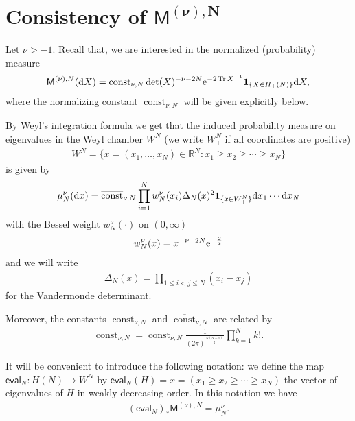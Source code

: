 \section[Consistency of $\mathsf{M}^{(\nu),N}$]{Consistency of $\boldsymbol{\mathsf{M}^{(\nu),N}}$}\label{section2}

Let $\nu>-1$. Recall that, we are interested in the normalized (probability) measure
\begin{gather*}
\mathsf{M}^{(\nu),N}({\rm d}X)= \operatorname{const}_{\nu, N} \det(X)^{-\nu-2N} {\rm e}^{-2\operatorname{Tr}X^{-1}}\mathbf{1}_{\{X \in H_+(N)\}}{\rm d}X,
\end{gather*}
where the normalizing constant $\operatorname{const}_{\nu, N}$ will be given explicitly below.

By Weyl's integration formula we get that the induced probability measure on eigenvalues in the Weyl chamber $W^N$ (we write $W^N_+$ if all coordinates are positive)
\begin{gather*}
W^N=\big\{x=(x_1,\dots,x_N) \in \mathbb{R}^N\colon x_1 \ge x_2 \ge \cdots \ge x_N \big\}
\end{gather*}
is given by
\begin{gather*}
\mu_N^{\nu}({\rm d}x)=\overline{\operatorname{const}}_{\nu, N}\prod_{i=1}^{N}w_N^{\nu}(x_i)\Delta_N(x)^2\mathbf{1}_{ \{x \in W_+^N \}}{\rm d}x_1\cdots {\rm d}x_N
\end{gather*}
with the Bessel weight $w_N^{\nu}(\cdot)$ on $(0,\infty)$
\begin{gather*}
w_N^{\nu}(x)=x^{-\nu-2N}{\rm e}^{-\frac{2}{x}}
\end{gather*}
and we will write
\begin{gather*}
\Delta_N(x)=\prod_{1 \le i<j \le N}^{}(x_i-x_j)
\end{gather*}
for the Vandermonde determinant.

Moreover, the constants $\operatorname{const}_{\nu, N}$ and $\overline{\operatorname{const}}_{\nu, N}$ are related by
\begin{gather*}
\operatorname{const}_{\nu, N}=\overline{\operatorname{const}}_{\nu, N}\frac{1}{(2\pi)^\frac{N(N-1)}{2}}\prod_{k=1}^{N}k!.
\end{gather*}

It will be convenient to introduce the following notation: we define the map $\mathsf{eval}_N\colon H(N) \to W^N$ by $\mathsf{eval}_N(H)=x=(x_1\ge x_2 \ge \cdots \ge x_N )$ the vector of eigenvalues of $H$ in weakly decreasing order. In this notation we have
\begin{gather*}
 (\mathsf{eval}_N )_*\mathsf{M}^{(\nu),N}=\mu_N^{\nu}.
\end{gather*}

